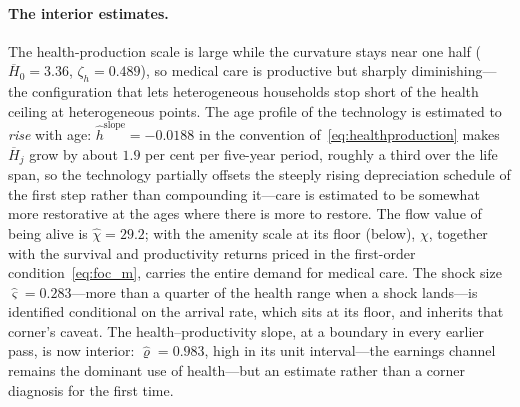 \documentclass[12pt,a4paper]{article}
\begin{document}
\paragraph{The interior estimates.} The health-production scale is large while the curvature stays near one half ($\overline{H}_0=3.36$, $\zeta_h=0.489$), so medical care is productive but sharply diminishing---the configuration that lets heterogeneous households stop short of the health ceiling at heterogeneous points. The age profile of the technology is estimated to \emph{rise} with age: $\widehat h^{\mathrm{slope}}=-0.0188$ in the convention of~\eqref{eq:healthproduction} makes $\overline{H}_j$ grow by about $1.9$ per cent per five-year period, roughly a third over the life span, so the technology partially offsets the steeply rising depreciation schedule of the first step rather than compounding it---care is estimated to be somewhat more restorative at the ages where there is more to restore. The flow value of being alive is $\widehat\chi=29.2$; with the amenity scale at its floor (below), $\chi$, together with the survival and productivity returns priced in the first-order condition~\eqref{eq:foc_m}, carries the entire demand for medical care. The shock size $\widehat\varsigma=0.283$---more than a quarter of the health range when a shock lands---is identified conditional on the arrival rate, which sits at its floor, and inherits that corner's caveat. The health--productivity slope, at a boundary in every earlier pass, is now interior: $\widehat\varrho=0.983$, high in its unit interval---the earnings channel remains the dominant use of health---but an estimate rather than a corner diagnosis for the first time.
\end{document}
